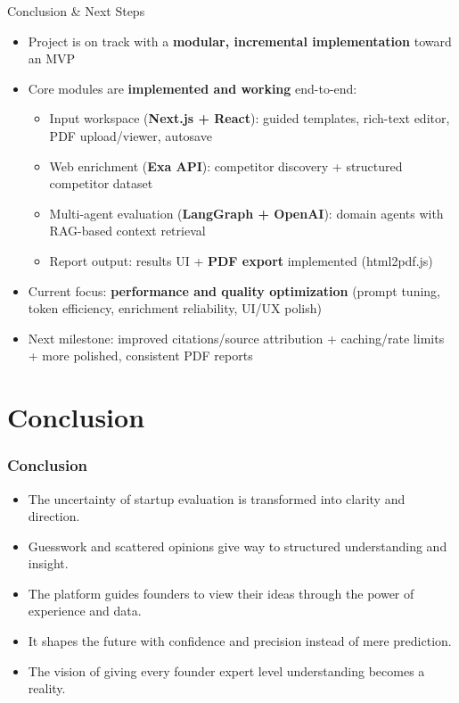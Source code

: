 \documentclass{beamer}
\begin{document}
\begin{frame}{Conclusion \& Next Steps}
\begin{itemize}
    \item Project is on track with a \textbf{modular, incremental implementation} toward an MVP
    \item Core modules are \textbf{implemented and working} end-to-end:
    \begin{itemize}
        \item Input workspace (\textbf{Next.js + React}): guided templates, rich-text editor, PDF upload/viewer, autosave
        \item Web enrichment (\textbf{Exa API}): competitor discovery + structured competitor dataset
        \item Multi-agent evaluation (\textbf{LangGraph + OpenAI}): domain agents with RAG-based context retrieval
        \item Report output: results UI + \textbf{PDF export} implemented (html2pdf.js)
    \end{itemize}
    \item Current focus: \textbf{performance and quality optimization} (prompt tuning, token efficiency, enrichment reliability, UI/UX polish)
    \item Next milestone: improved citations/source attribution + caching/rate limits + more polished, consistent PDF reports
\end{itemize}
\end{frame}

\section{Conclusion}


\begin{frame}
\frametitle{Conclusion}
\begin{itemize}
   \item The uncertainty of startup evaluation is transformed into clarity and direction.
\item Guesswork and scattered opinions give way to structured understanding and insight.
\item The platform guides founders to view their ideas through the power of experience and data.
\item  It shapes the future with confidence and precision instead of mere prediction.
\item  The vision of giving every founder expert level understanding becomes a reality.


\end{itemize}
\end{frame}
\end{document}
